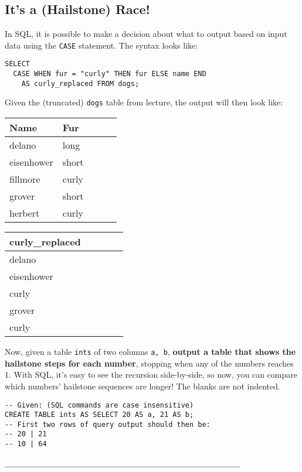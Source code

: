 \subsection*{It's a (Hailstone) Race!}
\begin{questions}
\question In SQL, it is possible to make a decision about what to output based on input data using the {\tt CASE} statement. The syntax looks like:
\begin{lstlisting}
SELECT
  CASE WHEN fur = "curly" THEN fur ELSE name END 
    AS curly_replaced FROM dogs;
\end{lstlisting}
Given the (truncated) {\tt dogs} table from lecture, the output will then look like:
\begin{multicols}{2}
\begin{center}
  \begin{tabular}{ l l l l l }
  \textbf{Name} & \textbf{Fur}  \\
  \hline
  delano & long \\
  eisenhower & short \\
  fillmore & curly \\
  grover & short \\
  herbert & curly 
 \end{tabular}
\end{center}
\columnbreak
\begin{center}
  \begin{tabular}{ l l l l l }
  \textbf{curly\_replaced} \\
  \hline
  delano \\
  eisenhower \\
  curly \\ 
  grover \\
  curly
  \end{tabular}
\end{center}
\end{multicols}

Now, given a table {\tt ints} of two columns {\tt a, b}, \textbf{output a table that shows the hailstone steps for each number}, stopping when any of the numbers reaches 1. With SQL, it's easy to see the recursion side-by-side, so now, you can compare which numbers' hailstone sequences are longer! The blanks are not indented.
\begin{lstlisting}
-- Given: (SQL commands are case insensitive)
CREATE TABLE ints AS SELECT 20 AS a, 21 AS b;
-- First two rows of query output should then be:
-- 20 | 21
-- 10 | 64

________________________________________________________


\end{lstlisting}
\end{questions}
